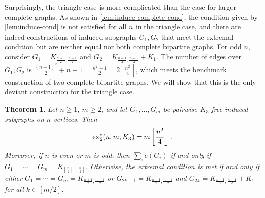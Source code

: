 \documentclass[12pt]{report}
\newtheorem{theorem}{Theorem}[chapter]
\newcommand*{\dex}{\textnormal{ex}_2}
\begin{document}
Surprisingly, the triangle case is more complicated than the case for larger complete graphs. As shown in \cref{lem:induce-complete-cond}, the condition given by \cref{lem:induce-cond} is not satisfied for all $n$ in the triangle case, and there are indeed constructions of induced subgraphs $G_1, G_2$ that meet the extremal condition but are neither equal nor both complete bipartite graphs. For odd $n$, consider $G_1 = K_{\frac{n - 1}{2}, \frac{n - 1}{2}}$ and $G_2 = K_{\frac{n - 1}{2}, \frac{n - 1}{2}} + K_1$. The number of edges over $G_1, G_2$ is $\frac{(n - 1)^2}{2} + n - 1 = \frac{n^2 - 1}{2} = 2\left\lfloor \frac{n^2}{4}\right\rfloor$, which meets the benchmark construction of two complete bipartite graphs. We will show that this is the only deviant construction for the triangle case.

\begin{theorem}\label{thm:induce-triangle}
  Let $n \geq 1$, $m \geq 2$, and let $G_1, \ldots, G_m$ be pairwise $K_3$-free induced subgraphs on $n$ vertices. Then
  \[
    \dex^*(n, m, K_3) = m \left\lfloor \frac{n^2}{4} \right\rfloor.
  \]
  Moreover, if $n$ is even or $m$ is odd, then $\sum_i e(G_i)$ if and only if $G_1 = \cdots = G_m = K_{\left\lfloor\frac{n}{2}\right\rfloor, \left\lceil\frac{n}{2}\right\rceil}$. Otherwise, the extremal condition is met if and only if either $G_1 = \cdots = G_m = K_{\frac{n + 1}{2}, \frac{n - 1}{2}}$ or $G_{2k + 1} = K_{\frac{n - 1}{2}, \frac{n - 1}{2}}$ and $G_{2k} = K_{\frac{n - 1}{2}, \frac{n - 1}{2}} + K_1$ for all $k \in [m/2]$.
\end{theorem}
\end{document}
